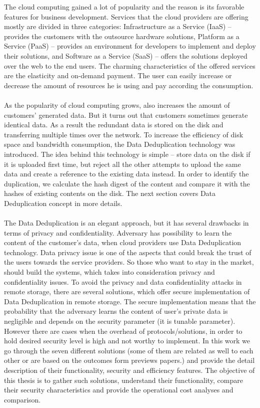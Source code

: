 \documentclass[12pt]{article}
\begin{document}
The cloud computing gained a lot of popularity and the reason is its  favorable features for  business development. Services that the cloud providers are offering  mostly are  divided in three categories: Infrastructure as a Service (IaaS) -- provides the customers with the outsource hardware solutions, Platform as a Service (PaaS) -- provides an environment for developers to implement and deploy their solutions, and Software as a Service (SaaS) -- offers the solutions deployed over the web to the end users. The  charming characteristics of the offered services  are the elasticity and on-demand payment. The user can easily increase or decrease the amount of resources he is using and pay according the consumption.\\\\
As the popularity of cloud computing grows, also increases the amount of customers' generated data. But it turns out that customers sometimes generate identical data.\cite{ratio} As a result the redundant data is stored on the disk and transferring multiple times over the network. To increase the efficiency of disk space and bandwidth consumption, the Data Deduplication
technology was introduced. The idea behind this technology is simple -- store data on the disk if it is uploaded first time, but reject  all the other attempts to upload the same data and create a reference to the existing data instead. In order to identify the duplication, we calculate the hash digest of the content  and compare it with the hashes of existing contents on the disk. The next section covers Data Deduplication concept in more details.\\\\
The Data Deduplication is an elegant approach, but it has several drawbacks in terms of privacy and confidentiality. Adversary has possibility to learn the content of the customer's data, when cloud providers use Data Deduplication technology. Data privacy issue  is one of the aspects that could break the trust of the users towards the service providers. So those who want to stay in the market, should build the systems, which takes into consideration privacy and confidentiality issues. To avoid the privacy and data confidentiality attacks in remote storage, there are several solutions, which offer secure implementation of Data Deduplication in remote storage. The secure implementation means that the probability that the adversary learns the content of user's private data is negligible and depends on the security parameter (it is tunable parameter). However there are cases when the overhead of protocols/solutions, in order to hold desired security level is high and not worthy to  implement. In this work we go through the seven different solutions (some of them are related as well to each other or are based on the outcomes form previews papers.) and provide the detail description of their functionality, security and efficiency features. The objective of this thesis is to gather such solutions, understand their functionality, compare their security characteristics and  provide the operational cost analyses and comparison.\\\\
\end{document}
